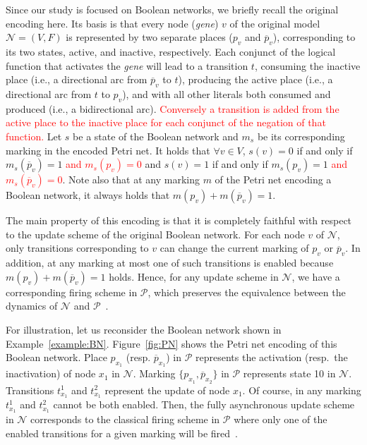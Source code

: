 \documentclass[preprint,12pt]{elsarticle}
\newcommand{\change}[1]{\textcolor{red}{#1}}
\begin{document}
Since our study is focused on Boolean networks, we briefly recall the original encoding here.
Its basis is that every node (\emph{gene}) \(v\) of the original model \(\mathcal{N} = (V, F)\) is represented by two separate places (\(p_v\) and \(\overline{p}_v\)), corresponding to its two states, active, and inactive, respectively.
Each conjunct of the logical function that activates the \emph{gene} will lead to a transition \(t\), consuming the inactive place (i.e., a directional arc from \(\overline{p}_v\) to \(t\)), producing the active place (i.e., a directional arc from \(t\) to \(p_v\)), and with all other literals both consumed and produced (i.e., a bidirectional arc).
\change{Conversely a transition is added from the active place to the inactive place for each conjunct of the negation of that function.}
Let \(s\) be a state of the Boolean network and \(m_s\) be its corresponding marking in the encoded Petri net.
It holds that \(\forall v \in V\), \(s(v) = 0\) if and only if \(m_s(\overline{p}_v) = 1\) \change{and \(m_s(p_v) = 0\)} and \(s(v) = 1\) if and only if \(m_s(p_v) = 1\) \change{and \(m_s(\overline{p}_v) = 0\)}. Note also that at any marking \(m\) of the Petri net encoding a Boolean network, it always holds that \(m(p_v) + m(\overline{p}_v) = 1\).

The main property of this encoding is that it is completely faithful with respect to the update scheme of the original Boolean network.
For each node \(v\) of \(\mathcal{N}\), only transitions corresponding to \(v\) can change the current marking of \(p_v\) or \(\overline{p}_v\).
In addition, at any marking at most one of such transitions is enabled because \(m(p_v) + m(\overline{p}_v) = 1\) holds.
Hence, for any update scheme in \(\mathcal{N}\), we have a corresponding firing scheme in \(\mathcal{P}\), which preserves the equivalence between the dynamics of \(\mathcal{N}\) and \(\mathcal{P}\)~\cite{DBLP:journals/nc/ChatainHKPT20}.

For illustration, let us reconsider the Boolean network shown in Example~\ref{example:BN}.
Figure~\ref{fig:PN} shows the Petri net encoding of this Boolean network.
Place \(p_{x_1}\) (resp. \(\overline{p}_{x_1}\)) in \(\mathcal{P}\) represents the activation (resp.\ the inactivation) of node \(x_1\) in \(\mathcal{N}\).
Marking \(\{p_{x_1}, \overline{p}_{x_2}\}\) in \(\mathcal{P}\) represents state 10 in \(\mathcal{N}\).
Transitions \(t^{1}_{x_1}\) and \(t^{2}_{x_1}\) represent the update of node \(x_1\).
Of course, in any marking \(t^{1}_{x_1}\) and \(t^{2}_{x_1}\) cannot be both enabled.
Then, the fully asynchronous update scheme in \(\mathcal{N}\) corresponds to the classical firing scheme in \(\mathcal{P}\) where only one of the enabled transitions for a given marking will be fired~\cite{Murata1989}.
\end{document}
